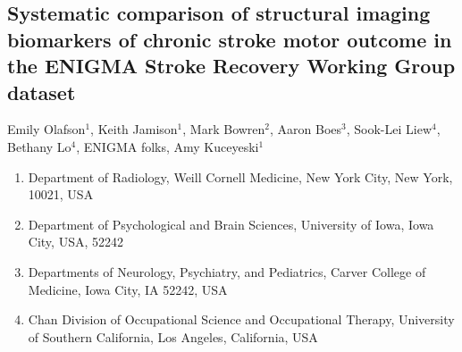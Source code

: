 \documentclass[10pt]{article}
\begin{document}
 

\begin{center}
{\large \section*{Systematic comparison of structural imaging biomarkers of chronic stroke motor outcome in the ENIGMA Stroke Recovery Working Group dataset}}
\end{center}

\begin{center}
Emily Olafson$^1$, Keith Jamison$^1$, Mark Bowren$^2$, Aaron Boes$^3$, Sook-Lei Liew$^4$, Bethany Lo$^4$, ENIGMA folks, Amy Kuceyeski$^1$
\end{center}

\begin{enumerate}
\item \textmd{Department of Radiology, Weill Cornell Medicine, New York City, New York, 10021, USA} 
\item \textmd{Department of Psychological and Brain Sciences, University of Iowa, Iowa City, USA, 52242} 
\item \textmd{Departments of Neurology, Psychiatry, and Pediatrics, Carver College of Medicine, Iowa City, IA 52242, USA} 
\item \textmd{Chan Division of Occupational Science and Occupational Therapy, University of Southern California, Los Angeles, California, USA}
\end{enumerate}
\end{document}
